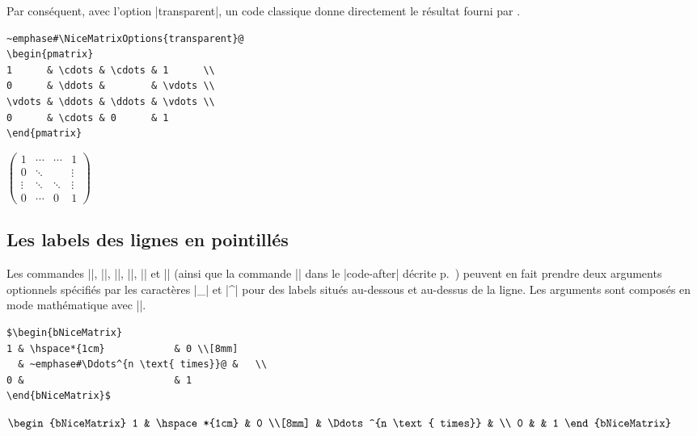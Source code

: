 \documentclass[dvipsnames]{article}%
\begin{document}
\bigskip 
Par conséquent, avec l'option |transparent|, un code classique donne directement
le résultat fourni par .\par\nobreak

\bigskip
\begin{scope}
\begin{BVerbatim}[baseline=c,boxwidth=10cm]
~emphase#\NiceMatrixOptions{transparent}@
\begin{pmatrix}
1      & \cdots & \cdots & 1      \\
0      & \ddots &        & \vdots \\
\vdots & \ddots & \ddots & \vdots \\
0      & \cdots & 0      & 1
\end{pmatrix}
\end{BVerbatim}
$\begin{pmatrix}
1      & \cdots & \cdots & 1      \\
0      & \ddots &        & \vdots \\
\vdots & \ddots & \ddots & \vdots \\
0      & \cdots & 0      & 1
\end{pmatrix}$
\end{scope}


\subsection{Les labels des lignes en pointillés}

Les commandes |\Ldots|, |\Cdots|, |\Vdots|, |\Ddots|, |\Iddots| et |\Hdotsfor|
(ainsi que la commande |\line| dans le |code-after| décrite
p.~\pageref{line-in-code-after}) peuvent en fait prendre deux arguments
optionnels spécifiés par les caractères |_| et |^| pour des labels situés
au-dessous et au-dessus de la ligne. Les arguments sont composés en mode
mathématique avec |\scriptstyle|.

\begin{BVerbatim}[baseline=c,boxwidth=10cm]
$\begin{bNiceMatrix}
1 & \hspace*{1cm}            & 0 \\[8mm]
  & ~emphase#\Ddots^{n \text{ times}}@ &   \\
0 &                          & 1 
\end{bNiceMatrix}$
\end{BVerbatim}
$\begin{bNiceMatrix}
1 & \hspace*{1cm}            & 0 \\[8mm]
  & \Ddots^{n \text{ times}} &   \\
0 &                          & 1 
\end{bNiceMatrix}$
\end{document}
